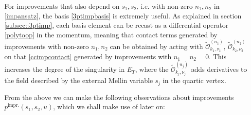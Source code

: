 \documentclass[11pt,a4paper]{article}
\begin{document}
For improvements that also depend on $s_1, s_2$, i.e. with non-zero $n_1,n_2$ in \eqref{impansatz}, the basis \eqref{3ptimpbasis} is extremely useful. As explained in section \ref{subsec::3ptimp}, each basis element can be recast as a differential operator \eqref{polytoop} in the momentum, meaning that contact terms generated by improvements with non-zero $n_1, n_2$ can be obtained by acting with $\widetilde{\mathcal{O}}_{k_1,\nu_1}^{\left(n_1\right)}$, $\widetilde{\mathcal{O}}_{k_2,\nu_2}^{\left(n_2\right)}$ on that \eqref{ccimpcontact} generated by improvements with $n_1=n_2=0$. This increases the degree of the singularity in $E_T$, where the $\widetilde{\mathcal{O}}_{k_j,\nu_j}^{\left(n_j\right)}$ adds derivatives to the field described by the external Mellin variable $s_j$ in the quartic vertex.

From the above we can make the following observations about improvements $p^{\text{impr.}}\left(s_1,s_2,u\right)$, which we shall make use of later on:
\end{document}
